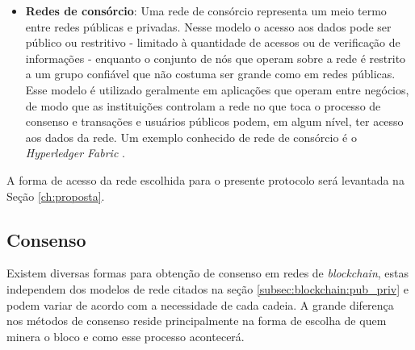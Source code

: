 \begin{itemize}
    \item\textbf{Redes de consórcio}: Uma rede de consórcio representa um meio termo entre redes públicas e privadas. Nesse modelo o acesso aos dados pode ser público ou restritivo - limitado à quantidade de acessos ou de verificação de informações - enquanto o conjunto de nós que operam sobre a rede é restrito a um grupo confiável que não costuma ser grande como em redes públicas. Esse modelo é utilizado geralmente em aplicações que operam entre negócios, de modo que as instituições controlam a rede no que toca o processo de consenso e transações e usuários públicos podem, em algum nível, ter acesso aos dados da rede. Um exemplo conhecido de rede de consórcio é o \textit{Hyperledger Fabric} \cite{blockchain:hyperledger}.
\end{itemize}

A forma de acesso da rede escolhida para o presente protocolo será levantada na Seção \ref{ch:proposta}.

\subsection{Consenso}
\label{subsec:blockchain:consenso}

Existem diversas formas para obtenção de consenso em redes de \textit{blockchain}, estas independem dos modelos de rede citados na seção \ref{subsec:blockchain:pub_priv} e podem variar de acordo com a necessidade de cada cadeia. A grande diferença nos métodos de consenso reside principalmente na forma de escolha de quem minera o bloco e como esse processo acontecerá.

